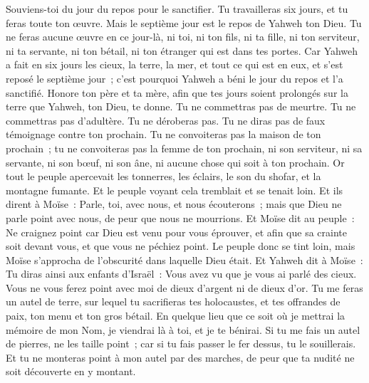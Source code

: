 \begin{multicols}{2}
Souviens-toi du jour du repos pour le sanctifier.
Tu travailleras six jours, et tu feras toute ton œuvre.
Mais le septième jour est le repos de Yahweh ton Dieu. Tu ne feras aucune œuvre en ce jour-là, ni toi, ni ton fils, ni ta fille, ni ton serviteur, ni ta servante, ni ton bétail, ni ton étranger qui est dans tes portes.
Car Yahweh a fait en six jours les cieux, la terre, la mer, et tout ce qui est en eux, et s'est reposé le septième jour~; c'est pourquoi Yahweh a béni le jour du repos et l'a sanctifié.
Honore ton père et ta mère, afin que tes jours soient prolongés sur la terre que Yahweh, ton Dieu, te donne.
Tu ne commettras pas de meurtre.
Tu ne commettras pas d'adultère.
Tu ne déroberas pas.
Tu ne diras pas de faux témoignage contre ton prochain.
Tu ne convoiteras pas la maison de ton prochain~; tu ne convoiteras pas la femme de ton prochain, ni son serviteur, ni sa servante, ni son bœuf, ni son âne, ni aucune chose qui soit à ton prochain.
Or tout le peuple apercevait les tonnerres, les éclairs, le son du shofar, et la montagne fumante. Et le peuple voyant cela tremblait et se tenait loin.
Et ils dirent à Moïse~: Parle, toi, avec nous, et nous écouterons~; mais que Dieu ne parle point avec nous, de peur que nous ne mourrions.
Et Moïse dit au peuple~: Ne craignez point car Dieu est venu pour vous éprouver, et afin que sa crainte soit devant vous, et que vous ne péchiez point.
Le peuple donc se tint loin, mais Moïse s'approcha de l'obscurité dans laquelle Dieu était.
Et Yahweh dit à Moïse~: Tu diras ainsi aux enfants d'Israël~: Vous avez vu que je vous ai parlé des cieux.
Vous ne vous ferez point avec moi de dieux d'argent ni de dieux d'or.
Tu me feras un autel de terre, sur lequel tu sacrifieras tes holocaustes, et tes offrandes de paix, ton menu et ton gros bétail. En quelque lieu que ce soit où je mettrai la mémoire de mon Nom, je viendrai là à toi, et je te bénirai.
Si tu me fais un autel de pierres, ne les taille point~; car si tu fais passer le fer dessus, tu le souillerais.
Et tu ne monteras point à mon autel par des marches, de peur que ta nudité ne soit découverte en y montant.

\end{multicols}
